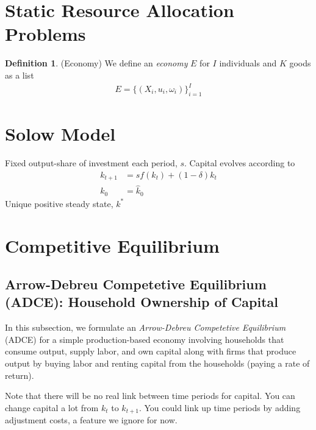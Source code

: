 \documentclass[12pt]{article}
\theoremstyle{plain}
\theoremstyle{definition}
\newtheorem{defn}[thm]{Definition}
\theoremstyle{remark}
\begin{document}
\section{Static Resource Allocation Problems}

\begin{defn}{(Economy)}
We define an \emph{economy} $E$ for $I$ individuals and $K$ goods as a
list
\begin{align*}
  E = \{(X_i,u_i,\omega_i)\}^I_{i=1}
\end{align*}
\end{defn}


\section{Solow Model}

Fixed output-share of investment each period, $s$. Capital evolves
according to
\begin{align*}
  k_{t+1} &= sf(k_t) + (1-\delta)k_t \\
  k_0 &= \hat{k}_0
\end{align*}
Unique positive steady state, $k^*$

\clearpage
\section{Competitive Equilibrium}

\subsection{Arrow-Debreu Competetive Equilibrium (ADCE): Household
Ownership of Capital}

In this subsection, we formulate an
\emph{Arrow-Debreu Competetive Equilibrium} (ADCE) for a simple
production-based economy involving households that consume output,
supply labor, and own capital along with firms that produce output by
buying labor and renting capital from the households (paying a rate of
return).

Note that there will be no real link between time periods for capital.
You can change capital a lot from $k_t$ to $k_{t+1}$. You could link up
time periods by adding adjustment costs, a feature we ignore for now.
\end{document}
